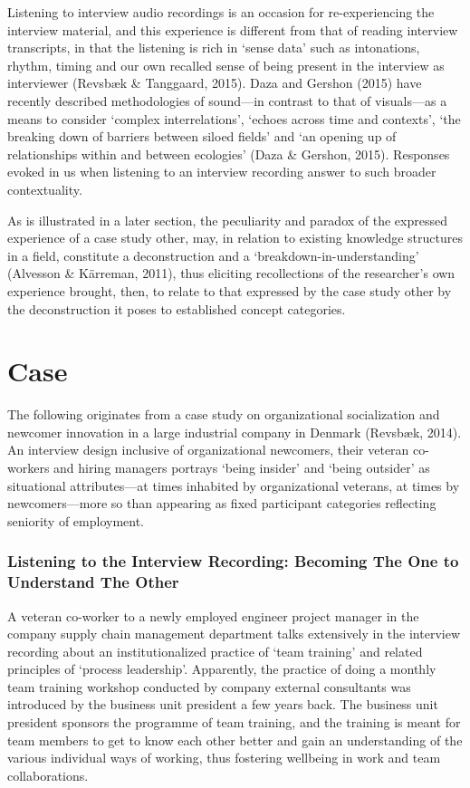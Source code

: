 Listening to interview audio recordings is an occasion for re-experiencing the interview material, and this experience is different from that of reading interview transcripts, in that the listening is rich in ‘sense data’ such as intonations, rhythm, timing and our own recalled sense of being present in the interview as interviewer (Revsbæk \& Tanggaard, 2015). Daza and Gershon (2015) have recently described methodologies of sound—in contrast to that of visuals—as a means to consider ‘complex interrelations’, ‘echoes across time and contexts’, ‘the breaking down of barriers between siloed fields’ and ‘an opening up of relationships within and between ecologies’ (Daza \& Gershon, 2015). Responses evoked in us when listening to an interview recording answer to such broader contextuality.  

As is illustrated in a later section, the peculiarity and paradox of the expressed experience of a case study other, may, in relation to existing knowledge structures in a field, constitute a deconstruction and a ‘breakdown-in-understanding’ (Alvesson \& Kärreman, 2011), thus eliciting recollections of the researcher’s own experience brought, then, to relate to that expressed by the case study other by the deconstruction it poses to established concept categories.

\chapter{Case}
The following originates from a case study on organizational socialization and newcomer innovation in a large industrial company in Denmark (Revsbæk, 2014).%
An interview design inclusive of organizational newcomers, their veteran co-workers and hiring managers portrays ‘being insider’ and ‘being outsider’ as situational attributes—at times inhabited by organizational veterans, at times by newcomers—more so than appearing as fixed participant categories reflecting seniority of employment.

\subsection{Listening to the Interview Recording: Becoming The One to Understand The Other}
A veteran co-worker to a newly employed engineer project manager in the company supply chain management department talks extensively in the interview recording about an institutionalized practice of ‘team training’ and related principles of ‘process leadership’. Apparently, the practice of doing a monthly team training workshop conducted by company external consultants was introduced by the business unit president a few years back. The business unit president sponsors the programme of team training, and the training is meant for team members to get to know each other better and gain an understanding of the various individual ways of working, thus fostering wellbeing in work and team collaborations. 

